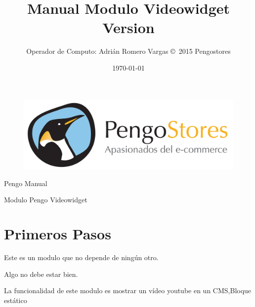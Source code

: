 \documentclass[12pt, letterpaper]{article}
\title{Manual Modulo Videowidget \\\normalsize Version \versionnumber}
\author{ Operador de Computo: Adrián Romero Vargas \copyright~2015 Pengostores }
\date{\today}
\begin{document}
\begin{titlepage}

\begin{figure}[htp]
\centering
\includegraphics[width=15cm]{logo-pengo}
\end{figure}

\currenttime

\par

\begin{center}
{\huge Pengo Manual}
\end{center}


\centering
{\fontsize{1cm}{1cm}\selectfont Modulo Pengo Videowidget 
\par}



\end{titlepage}

\tableofcontents{}

\listoftables{}

\listoffigures

\maketitle

\section{Primeros Pasos}
 
{\centering

Este es un modulo que no depende de ningún otro.



}


Algo no debe estar bien. 

La funcionalidad de este modulo es mostrar un vídeo youtube en un CMS,Bloque estático 
\end{document}
